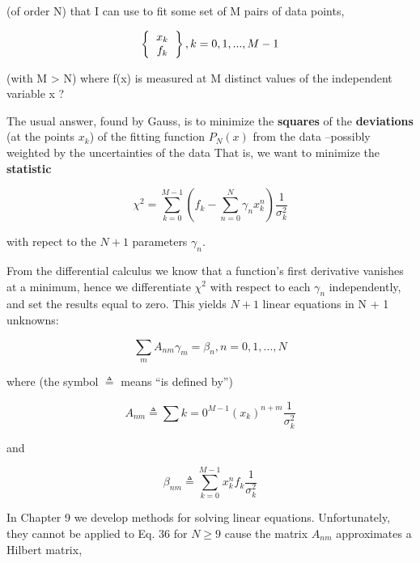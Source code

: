 (of order N) that I can use to fit some set of M pairs of data points,

\begin{equation}
    \left \{
      \begin{tabular}{c}
      $x_{k}$ \\
      $f_{k}$
      \end{tabular}
    \right \}
    , k=0,1, ... , M-1
\end{equation}

(with M > N) where f(x) is measured at M distinct values of the independent variable x ?

The usual answer, found by Gauss, is to minimize the \textbf{squares} of the \textbf{deviations} (at the points $x_k$) of the fitting function $P_N(x)$ from the data --possibly weighted by the uncertainties of the data That is, we want to minimize the \textbf{statistic}

\begin{equation}
\chi^2 = \sum_{k=0}^{M-1} \left( f_k - \sum_{n=0}^{N} \gamma_n x_{k}^n \right) \frac{1}{\sigma_{k}^{2}}
\end{equation}

with repect to the $N + 1$ parameters $\gamma_{n}$.

From the differential calculus we know that a function's first derivative vanishes at a minimum, hence we differentiate $\chi^{2}$ with respect to each $\gamma_{n}$ independently, and set the results equal to zero. This yields $N + 1$ linear equations in N + 1 unknowns:

\begin{equation}
\sum_{m} A_{nm} \gamma_{m} = \beta_{n}, n = 0, 1, ... , N
\end{equation}

where (the symbol $\triangleq$ means “is defined by”)

\begin{equation}
A_{nm} \triangleq \sum{k=0}^{M-1}(x_{k})^{n+m} \frac{1}{\sigma_{k}^{2}}
\end{equation}

and

\begin{equation}
\beta_{nm} \triangleq \sum_{k=0}^{M-1}x_{k}^{n}f_{k}\frac{1}{\sigma_{k}^{2}}
\end{equation}

In Chapter 9 we develop methods for solving linear equations. Unfortunately, they cannot be applied to Eq. 36 for $N \geq 9$ cause the matrix $A_{nm}$ approximates a Hilbert matrix,

